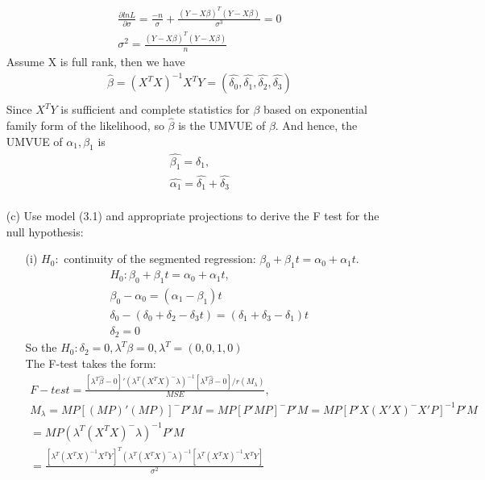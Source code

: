 \documentclass{homework}
\begin{document}
\begin{itemize}
\[\begin{split}
    \frac{\partial lnL}{\partial \sigma} = \frac{-n}{\sigma} + \frac{(Y-X\beta)^T(Y-X\beta)}{\sigma^3} = 0\\
    \sigma^2 = \frac{(Y-X\beta)^T(Y-X\beta)}{n}
    \end{split}
    \]     
    Assume X is full rank, then we have 
    \[ 
    \begin{split}
    \hat{\beta} = (X^TX)^{-1}X^TY = (\hat{\delta_0}, \hat{\delta_1},\hat{\delta_2}, \hat{\delta_3})\\
    \end{split}
    \]   
    Since $X^TY$ is sufficient and complete statistics for $\beta$ based on exponential family form of the likelihood, so $\hat{\beta}$ is the UMVUE of $\beta$. And hence, the UMVUE of $\alpha_1, \beta_1$ is 
    \[ 
    \begin{split}
    \hat{\beta_1} = \hat{\delta_1},\\
    \hat{\alpha_1}=\hat{\delta_1}+ \hat{\delta_3}\\
    \end{split}
    \] 
    \item[(c)] Use model (3.1) and appropriate projections to derive the F test for the null hypothesis:\\
    \begin{itemize}
        \item [(i)] $H_0:$ continuity of the segmented regression: $\beta_0 + \beta_1 t = \alpha_0 + \alpha_1 t$. 
    \[ 
    \begin{split}
    H_0: \beta_0 + \beta_1 t = \alpha_0 + \alpha_1 t,\\
    \beta_0 - \alpha_0 = (\alpha_1 - \beta_1)t\\
    \delta_0 - (\delta_0 + \delta_2 - \delta_3t) = (\delta_1 + \delta_3- \delta_1)t\\
    \delta_2 = 0
    \end{split}
    \]    
    So the $H_0: \delta_2 = 0, \lambda^T \beta = 0, \lambda^T = (0,0,1,0)$\\
    The F-test takes the form:
    \[ 
    \begin{split}
    F-test = \frac{[\lambda^T\hat{\beta}-0]' (\lambda^T (X^TX)^{-} \lambda)^{-1} [\lambda^T\hat{\beta}-0]/r(M_{\lambda}) }{MSE},\\
    M_{\lambda} = MP [(MP)'(MP)]^{-} P'M= MP [P'MP]^{-} P'M= MP[P' X(X'X)^{-}X' P]^{-1} P'M\\
   = MP (\lambda^T (X^TX)^{-} \lambda)^{-1} P'M\\
    = \frac{[\lambda^T (X^TX)^{-1}X^TY]^T (\lambda^T (X^TX)^{-} \lambda)^{-1} [\lambda^T (X^TX)^{-1}X^TY]}{\sigma^2} \\

\end{split}\]
\end{itemize}
\end{itemize}
\end{document}
